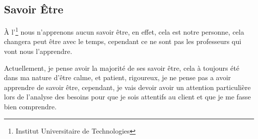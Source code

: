 \documentclass[12pt,a4paper,openany]{article}
\begin{document}
	\subsection{Savoir Être}
	À l'\footnote{Institut Universitaire de Technologies} nous n'apprenons aucun savoir être, en effet, cela est notre personne,
	cela changera peut être avec le temps, cependant ce ne sont pas les professeurs qui vont nous l'apprendre. 

	Actuellement, je pense avoir la majorité de ses savoir être, cela à toujours été dans ma nature d'être calme, et patient, rigoureux, je ne
	pense pas a avoir apprendre de savoir être, cependant, je vais devoir avoir un attention particulière lors de l'analyse des besoins
	pour que je sois attentifs au client et que je me fasse bien comprendre. 
\end{document}
